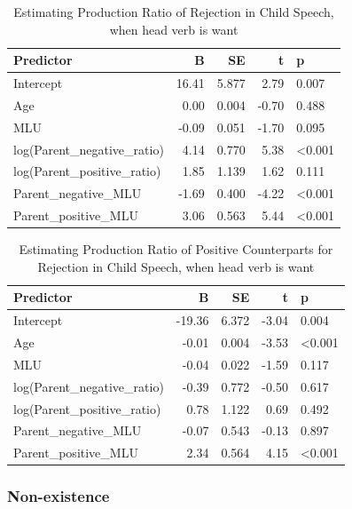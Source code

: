 \documentclass[
  english,
  man,floatsintext]{apa6}
\begin{document}
\begin{table}

\caption{\label{tab:unnamed-chunk-2}Estimating Production Ratio of Rejection in Child Speech, when head verb is want}
\centering
\begin{tabular}[t]{l|r|r|r|l}
\hline
Predictor & B & SE & t & p\\
\hline
Intercept & 16.41 & 5.877 & 2.79 & 0.007\\
\hline
Age & 0.00 & 0.004 & -0.70 & 0.488\\
\hline
MLU & -0.09 & 0.051 & -1.70 & 0.095\\
\hline
log(Parent\_negative\_ratio) & 4.14 & 0.770 & 5.38 & <0.001\\
\hline
log(Parent\_positive\_ratio) & 1.85 & 1.139 & 1.62 & 0.111\\
\hline
Parent\_negative\_MLU & -1.69 & 0.400 & -4.22 & <0.001\\
\hline
Parent\_positive\_MLU & 3.06 & 0.563 & 5.44 & <0.001\\
\hline
\end{tabular}
\end{table}

\begin{table}

\caption{\label{tab:unnamed-chunk-2}Estimating Production Ratio of Positive Counterparts for Rejection in Child Speech, when head verb is want}
\centering
\begin{tabular}[t]{l|r|r|r|l}
\hline
Predictor & B & SE & t & p\\
\hline
Intercept & -19.36 & 6.372 & -3.04 & 0.004\\
\hline
Age & -0.01 & 0.004 & -3.53 & <0.001\\
\hline
MLU & -0.04 & 0.022 & -1.59 & 0.117\\
\hline
log(Parent\_negative\_ratio) & -0.39 & 0.772 & -0.50 & 0.617\\
\hline
log(Parent\_positive\_ratio) & 0.78 & 1.122 & 0.69 & 0.492\\
\hline
Parent\_negative\_MLU & -0.07 & 0.543 & -0.13 & 0.897\\
\hline
Parent\_positive\_MLU & 2.34 & 0.564 & 4.15 & <0.001\\
\hline
\end{tabular}
\end{table}

\clearpage

\hypertarget{non-existence}{%
\subsubsection{Non-existence}\label{non-existence}}
\end{document}
